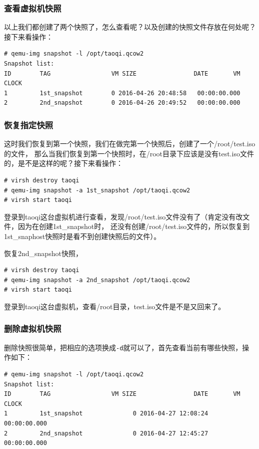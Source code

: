 \subsubsection{查看虚拟机快照}
\label{sec:listVmSnapShot}

以上我们都创建了两个快照了，怎么查看呢？以及创建的快照文件存放在何处呢？接下来看操作：

\begin{verbatim}
# qemu-img snapshot -l /opt/taoqi.qcow2 
Snapshot list:
ID        TAG                 VM SIZE                DATE       VM CLOCK
1         1st_snapshot        0 2016-04-26 20:48:58   00:00:00.000
2         2nd_snapshot        0 2016-04-26 20:49:52   00:00:00.000
\end{verbatim}

\subsubsection{恢复指定快照}
\label{sec:resumeSpecificVmSnapShost}

这时我们恢复到第一个快照，我们在做完第一个快照后，创建了一个/root/test.iso的文件，
那么当我们恢复到第一个快照时，在/root目录下应该是没有test.iso文件的，是不是这样的呢？接下来看操作：

\begin{verbatim}
# virsh destroy taoqi
# qemu-img snapshot -a 1st_snapshot /opt/taoqi.qcow2
# virsh start taoqi
\end{verbatim}

登录到taoqi这台虚拟机进行查看，发现/root/test.iso文件没有了（肯定没有改文件，因为在创建1st\_snapshot时，
还没有创建/root/test.iso文件的，所以恢复到1st\_snaphost快照时是看不到创建快照后的文件）。

恢复2nd\_snapshot快照，

\begin{verbatim}
# virsh destroy taoqi
# qemu-img snapshot -a 2nd_snapshot /opt/taoqi.qcow2
# virsh start taoqi
\end{verbatim}

登录到taoqi这台虚拟机，查看/root目录，test.iso文件是不是又回来了。

\subsubsection{删除虚拟机快照}
\label{sec:deleteVmSnapShot}

删除快照很简单，把相应的选项换成\verb|-d|就可以了，首先查看当前有哪些快照，操作如下：

\begin{verbatim}
# qemu-img snapshot -l /opt/taoqi.qcow2 
Snapshot list:
ID        TAG                 VM SIZE                DATE       VM CLOCK
1         1st_snapshot              0 2016-04-27 12:08:24   00:00:00.000
2         2nd_snapshot              0 2016-04-27 12:45:27   00:00:00.000
\end{verbatim}

